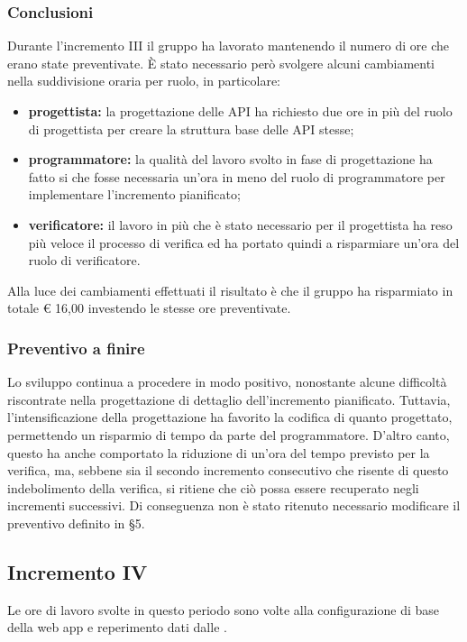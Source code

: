 		\subsubsection{Conclusioni}
			Durante l'incremento III il gruppo ha lavorato mantenendo il numero di ore che erano state preventivate. È stato necessario però svolgere alcuni cambiamenti nella suddivisione oraria per ruolo, in particolare:
			\begin{itemize}
				\item \textbf{progettista:} la progettazione delle API ha richiesto due ore in più del ruolo di progettista per creare la struttura base delle API stesse;
				\item \textbf{programmatore:} la qualità del lavoro svolto in fase di progettazione ha fatto si che fosse necessaria un'ora in meno del ruolo di programmatore per implementare l'incremento pianificato;
				\item \textbf{verificatore:} il lavoro in più che è stato necessario per il progettista ha reso più veloce il processo di verifica ed ha portato quindi a risparmiare un'ora del ruolo di verificatore.
			\end{itemize}
			Alla luce dei cambiamenti effettuati il risultato è che il gruppo ha risparmiato in totale € 16,00 investendo le stesse ore preventivate.
		
		\subsubsection{Preventivo a finire}
			Lo sviluppo continua a procedere in modo positivo, nonostante alcune difficoltà riscontrate nella progettazione di dettaglio dell'incremento pianificato. Tuttavia, l'intensificazione della progettazione ha favorito la codifica di quanto progettato, permettendo un risparmio di tempo da parte del programmatore.
			\newline
			D'altro canto, questo ha anche comportato la riduzione di un'ora del tempo previsto per la verifica, ma, sebbene sia il secondo incremento consecutivo che risente di questo indebolimento della verifica, si ritiene che ciò possa essere recuperato negli incrementi successivi.
			\newline
			Di conseguenza non è stato ritenuto necessario modificare il preventivo definito in \S5.
				
		
		\subsection{Incremento IV}
		Le ore di lavoro svolte in questo periodo sono volte alla configurazione di base della web app e reperimento dati dalle .
